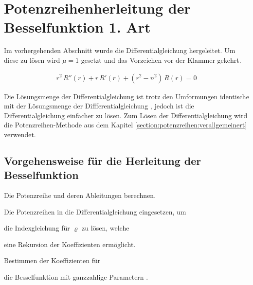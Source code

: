 \section[Potenzreihenherleitung der Besselfunktion]{Potenzreihenherleitung der Besselfunktion 1. Art}
\begin{normalsize}
Im vorhergehenden Abschnitt wurde die Differentialgleichung  hergeleitet.
Um diese zu l\"osen wird $\mu = 1$ gesetzt und das Vorzeichen vor der Klammer gekehrt.
\end{normalsize}
\begin{align}
	r^2 \, R'' \left( r \right)
	+
	r \, R' \left( r \right)
	+
	\left( r^2 - n^2 \right) \, R \left( r \right)
	=
	0
	\label{eq:bessel:dgl}
\end{align}
\begin{normalsize}
Die L\"osungsmenge der Differentialgleichung  ist trotz den Umformungen identische mit der L\"osungsmenge der Diffferentialgleichung , jedoch ist die Differentialgleichung  einfacher zu l\"osen.
Zum L\"osen der Differentialgleichung  wird die Potenzreihen-Methode aus dem Kapitel \ref{section:potenzreihen:verallgemeinert} verwendet.
\end{normalsize}
\subsection{Vorgehensweise f\"ur die Herleitung der Besselfunktion}
\begin{compactenum}
	\item Die Potenzreihe und deren Ableitungen berechnen.
	\item Die Potenzreihen in die Differentialgleichung  eingesetzen, um
	\item die Indexgleichung f\"ur $\varrho$ zu l\"osen, welche
	\item eine Rekursion der Koeffizienten erm\"oglicht.
	\item Bestimmen der Koeffizienten f\"ur
	\item die Besselfunktion mit ganzzahlige Parametern .
\end{compactenum}
